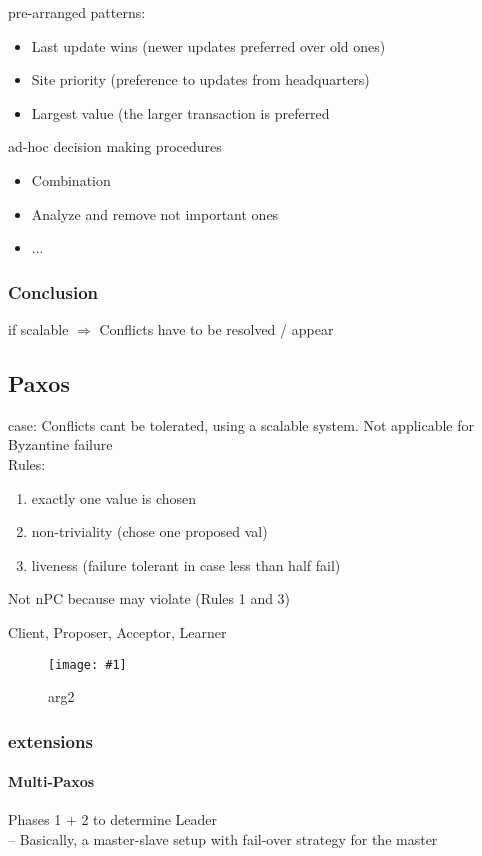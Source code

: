 \documentclass[a4paper,12pt]{article}%
\newcommand{\grafik}[2]{\begin{figure}[!htb]
		\noindent\texttt{[image: \#1]}
		\caption{\textrm{#2}}%
	\end{figure}}
\begin{document}
 pre-arranged patterns:
 \begin{itemize}
 	\item Last update wins (newer updates preferred over old ones)
 	\item  Site priority (preference to updates from headquarters)
 	\item  Largest value (the larger transaction is preferred
 \end{itemize}
 ad-hoc decision making procedures
 \begin{itemize}
 	\item Combination
 	\item Analyze and remove not important ones
 	\item ...
 \end{itemize}
 
 
 
 
 
 
 
 
 
 
 \subsubsection{Conclusion}
 if scalable $\Rightarrow$ Conflicts have to be resolved / appear
 
 \newpage
 \subsection{Paxos}
 case: Conflicts cant be tolerated, using a scalable system. Not applicable for Byzantine failure \\
 Rules:
 \begin{enumerate}
\item exactly one value is chosen
\item non-triviality (chose one proposed val)
\item liveness (failure tolerant in case less than half fail)
 \end{enumerate}
 Not nPC  because may violate (Rules 1 and 3)
 
 Client, Proposer, Acceptor, Learner
 \grafik{zusa2/paxos.png}{arg2}
\subsubsection{extensions}
\paragraph{Multi-Paxos}
Phases 1 + 2 to determine Leader\\
– Basically, a master-slave setup with fail-over strategy for the master
\end{document}
